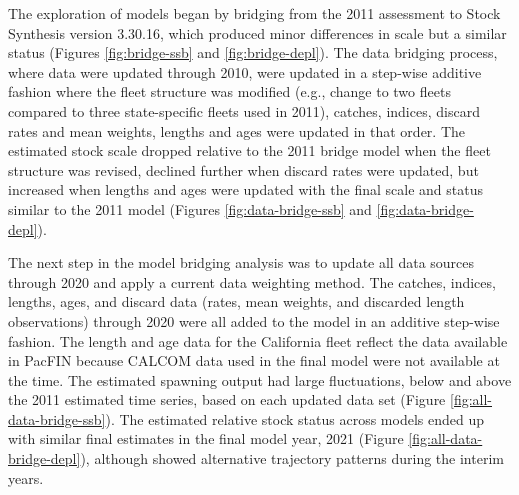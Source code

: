\documentclass[11pt,
  english,
  a4paper,
]{article}
\begin{document}
The exploration of models began by bridging from the 2011 assessment to Stock Synthesis version 3.30.16, which produced minor differences in scale but a similar status (Figures \ref{fig:bridge-ssb} and \ref{fig:bridge-depl}). The data bridging process, where data were updated through 2010, were updated in a step-wise additive fashion where the fleet structure was modified (e.g., change to two fleets compared to three state-specific fleets used in 2011), catches, indices, discard rates and mean weights, lengths and ages were updated in that order. The estimated stock scale dropped relative to the 2011 bridge model when the fleet structure was revised, declined further when discard rates were updated, but increased when lengths and ages were updated with the final scale and status similar to the 2011 model (Figures \ref{fig:data-bridge-ssb} and \ref{fig:data-bridge-depl}).

\leavevmode\tagmcend\tagstructend\par


The next step in the model bridging analysis was to update all data sources through 2020 and apply a current data weighting method. The catches, indices, lengths, ages, and discard data (rates, mean weights, and discarded length observations) through 2020 were all added to the model in an additive step-wise fashion. The length and age data for the California fleet reflect the data available in PacFIN because CALCOM data used in the final model were not available at the time. The estimated spawning output had large fluctuations, below and above the 2011 estimated time series, based on each updated data set (Figure \ref{fig:all-data-bridge-ssb}). The estimated relative stock status across models ended up with similar final estimates in the final model year, 2021 (Figure \ref{fig:all-data-bridge-depl}), although showed alternative trajectory patterns during the interim years.

\leavevmode\tagmcend\tagstructend\par

\end{document}
